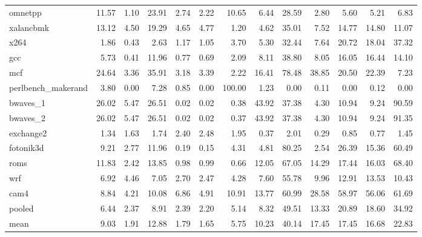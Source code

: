 \documentclass[10pt,a4paper]{article}
\begin{document}
{\begin{longtable}{@{}lrrrrrrrrrrrr@{}}
omnetpp & 11.57 & 1.10 & 23.91 & 2.74 & 2.22 & 10.65 & 6.44 & 28.59 & 2.80 & 5.60 & 5.21 & 6.83 \\
xalancbmk & 13.12 & 4.50 & 19.29 & 4.65 & 4.77 & 1.20 & 4.62 & 35.01 & 7.52 & 14.77 & 14.80 & 11.07 \\
x264 & 1.86 & 0.43 & 2.63 & 1.17 & 1.05 & 3.70 & 5.30 & 32.44 & 7.64 & 20.72 & 18.04 & 37.32 \\
gcc & 5.73 & 0.41 & 11.96 & 0.77 & 0.69 & 2.09 & 8.11 & 38.80 & 8.05 & 16.05 & 16.44 & 14.10 \\
mcf & 24.64 & 3.36 & 35.91 & 3.18 & 3.39 & 2.22 & 16.41 & 78.48 & 38.85 & 20.50 & 22.39 & 7.23 \\
perlbench\_makerand & 3.80 & 0.00 & 7.28 & 0.85 & 0.00 & 100.00 & 1.23 & 0.00 & 0.11 & 0.00 & 0.12 & 0.00 \\
bwaves\_1 & 26.02 & 5.47 & 26.51 & 0.02 & 0.02 & 0.38 & 43.92 & 37.38 & 4.30 & 10.94 & 9.24 & 90.59 \\
bwaves\_2 & 26.02 & 5.47 & 26.51 & 0.02 & 0.02 & 0.37 & 43.92 & 37.38 & 4.30 & 10.94 & 9.24 & 91.35 \\
exchange2 & 1.34 & 1.63 & 1.74 & 2.40 & 2.48 & 1.95 & 0.37 & 2.01 & 0.29 & 0.85 & 0.77 & 1.45 \\
fotonik3d & 9.21 & 2.77 & 11.96 & 0.19 & 0.15 & 4.31 & 4.81 & 80.25 & 2.54 & 26.39 & 15.36 & 60.49 \\
roms & 11.83 & 2.42 & 13.85 & 0.98 & 0.99 & 0.66 & 12.05 & 67.05 & 14.29 & 17.44 & 16.03 & 68.40 \\
wrf & 6.92 & 4.46 & 7.05 & 2.70 & 2.47 & 4.28 & 7.60 & 55.78 & 9.96 & 12.91 & 13.53 & 10.43 \\
cam4 & 8.84 & 4.21 & 10.08 & 6.86 & 4.91 & 10.91 & 13.77 & 60.99 & 28.58 & 58.97 & 56.06 & 61.69 \\
\midrule
pooled & 6.44 & 2.37 & 8.91 & 2.39 & 2.20 & 5.14 & 8.32 & 49.51 & 13.33 & 20.89 & 18.60 & 34.92 \\
mean & 9.03 & 1.91 & 12.88 & 1.79 & 1.65 & 5.75 & 10.23 & 40.14 & 17.45 & 17.45 & 16.68 & 22.83 \\
\end{longtable}
}
\end{document}
